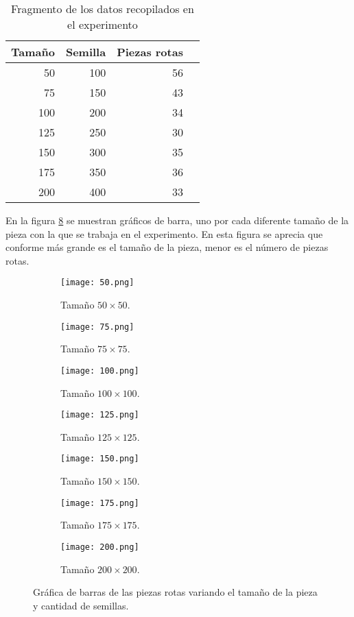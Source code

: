 \documentclass[12pt,letterpaper]{article}
\begin{document}
\begin{table}
\centering
\caption{Fragmento de los datos recopilados en el experimento}
\begin{tabular}{rrrr}
  \hline
Tamaño & Semilla & Piezas rotas \\ 
  \hline
 50 & 100 & 56\\ 
 75 & 150 & 43 \\ 
 100 & 200 & 34 \\ 
 125 & 250 & 30 \\ 
 150 & 300 & 35 \\ 
 175 & 350 & 36 \\ 
 200 & 400 & 33 \\ 
   \hline
\end{tabular}
\label{datos}
\end{table}
En la figura \ref{barplot} se muestran gráficos de barra, uno por cada diferente tamaño de la pieza con la que se trabaja en el experimento. En esta figura se aprecia que conforme más grande es el tamaño de la pieza, menor es el número de piezas rotas. 
\begin{figure}
 	\centering
 	\begin{subfigure}[b]{0.3\linewidth}
 		\texttt{[image: 50.png]}
 		 \caption{Tamaño $50\times 50$.}
 		\label{b50}
 	\end{subfigure}
 	\begin{subfigure}[b]{0.3\linewidth}
 		\texttt{[image: 75.png]}
 		 \caption{Tamaño $75\times 75$.}
 		\label{b75}
 	\end{subfigure}
 	\begin{subfigure}[b]{0.3\linewidth}
 		\texttt{[image: 100.png]}
 		\caption{Tamaño $100 \times 100$.}
 		\label{b100}
 	\end{subfigure}
 	 	\begin{subfigure}[b]{0.3\linewidth}
 		\texttt{[image: 125.png]}
 		 \caption{Tamaño $125 \times 125$.}
 		\label{b125}
 	\end{subfigure}
 	\begin{subfigure}[b]{0.3\linewidth}
 		\texttt{[image: 150.png]}
 		 \caption{Tamaño $150 \times 150$.}
 		\label{b150}
 	\end{subfigure}
 	\begin{subfigure}[b]{0.3\linewidth}
 		\texttt{[image: 175.png]}
 		\caption{Tamaño $175 \times 175$.}
 		\label{b175}
 	\end{subfigure}
 	 	\begin{subfigure}[b]{0.3\linewidth}
 		\texttt{[image: 200.png]}
 		\caption{Tamaño $200 \times 200$.}
 		\label{b200}
 	\end{subfigure}
 	\caption{Gráfica de barras de las piezas rotas variando el tamaño de la pieza y cantidad de semillas.}  		
\label{barplot}
 \end{figure}
 
\end{document}
